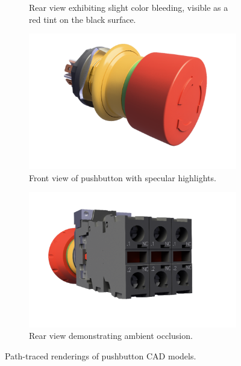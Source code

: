 \begin{figure}[H]
\begin{subfigure}[t]{0.38\textwidth}
        \caption{Rear view exhibiting slight color bleeding, visible as a red tint on the black surface.}
        \label{fig:demo-color-bleeding}
    \end{subfigure}
    \hspace*{1cm}
    \vfill
    \vspace*{0.5cm}
    \hspace*{1cm}
    \begin{subfigure}[t]{0.38\textwidth}
        \includegraphics[width=\textwidth]{resources/demo-specular.png}
        \caption{Front view of pushbutton with specular highlights.}
        \label{fig:demo-specular}
    \end{subfigure}
    \hfill
    \begin{subfigure}[t]{0.38\textwidth}
        \includegraphics[width=\textwidth]{resources/demo-ambient-occlusion.png}
        \caption{Rear view demonstrating ambient occlusion.}
        \label{fig:demo-ambient-occlusion}
    \end{subfigure}
    \hspace*{1cm}
    \caption{Path-traced renderings of pushbutton \gls{CAD} models.}
    \label{fig:rendering-showcase}
\end{figure}
